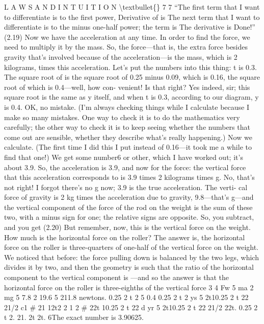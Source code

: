 \documentclass[10pt,oneside]{article}
\begin{document}
L A W S  A N D  I N T U I T I O N \textbackslash{}textbullet\{\} 7 7 “The first term that I want to differentiate is to the first power, Derivative of is The next term that I want to differentiate is to the minus one-half power; the term is The derivative is Done!” (2.19) Now we have the acceleration at any time. In order to find the force, we need to multiply it by the mass. So, the force---that is, the extra force besides gravity that’s involved because of the acceleration---is the mass, which is 2 kilograms, times this acceleration. Let’s put the numbers into this thing: t is 0.3. The square root of is the square root of 0.25 minus 0.09, which is 0.16, the square root of which is 0.4---well, how con- venient! Is that right? Yes indeed, sir; this square root is the same as y itself, and when t is 0.3, according to our diagram, y is 0.4. OK, no mistake. (I’m always checking things while I calculate because I make so many mistakes. One way to check it is to do the mathematics very carefully; the other way to check it is to keep seeing whether the numbers that come out are sensible, whether they describe what’s really happening.) Now we calculate. (The first time I did this I put instead of 0.16---it took me a while to find that one!) We get some number6 or other, which I have worked out; it’s about 3.9. So, the acceleration is 3.9, and now for the force: the vertical force that this acceleration corresponds to is 3.9 times 2 kilograms times g. No, that’s not right! I forgot there’s no g now; 3.9 is the true acceleration. The verti- cal force of gravity is 2 kg times the acceleration due to gravity, 9.8---that’s g---and the vertical component of the force of the rod on the weight is the sum of these two, with a minus sign for one; the relative signs are opposite. So, you subtract, and you get (2.20) But remember, now, this is the vertical force on the weight. How much is the horizontal force on the roller? The answer is, the horizontal force on the roller is three-quarters of one-half of the vertical force on the weight. We noticed that before: the force pulling down is balanced by the two legs, which divides it by two, and then the geometry is such that the ratio of the horizontal component to the vertical component is ---and so the answer is that the horizontal force on the roller is three-eighths of the vertical force 3 4 Fw 5 ma 2 mg 5 7.8 2 19.6 5 211.8 newtons. 0.25 2 t 2 5 0.4 0.25 2 t 2 ys 5 2t10.25 2 t 22 21/2 c1 \# 21 12t2 2 1 2 \# 22t 10.25 2 t 22 d yr 5 2t10.25 2 t 22 21/2 22t. 0.25 2 t 2. 21. 2t 2t. 6The exact number is 3.90625.\par
\end{document}
